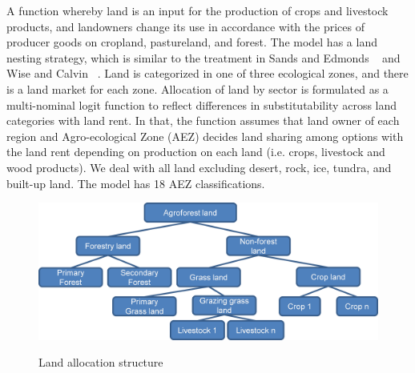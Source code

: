 \documentclass[10pt,a4paper,titlepage,dvipdfmx]{book}
\begin{document}
A function whereby land is an input for the production of crops and livestock products, and landowners change its use in accordance with the prices of producer goods on cropland, pastureland, and forest. The model has a land nesting strategy, which is similar to the treatment in  Sands and Edmonds ~\cite{RN1860} and Wise and Calvin ~\cite{RN1597}. Land is categorized in one of three ecological zones, and there is a land market for each zone. Allocation of land by sector is formulated as a multi-nominal logit function to reflect differences in substitutability across land categories with land rent. In that, the function assumes that land owner of each region and Agro-ecological Zone (AEZ) decides land sharing among options with the land rent depending on production on each land (i.e. crops, livestock and wood products). We deal with all land excluding desert, rock, ice, tundra, and built-up land. The model has 18 AEZ classifications.

\begin{figure}
\includegraphics[width=1\textwidth]{fig/image22.png}
\label{fig:12}
\caption{\label{fig:LanAlloStr}Land allocation structure}
\end{figure}
\end{document}
